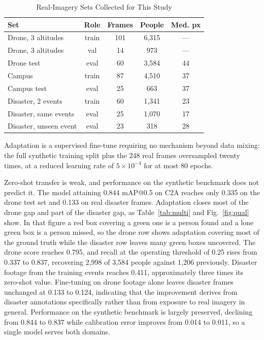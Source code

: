 \documentclass[conference,a4paper]{IEEEtran}
\begin{document}
\begin{table}[t]
\caption{Real-Imagery Sets Collected for This Study}
\label{tab:real}
\begin{center}
\small
\setlength{\tabcolsep}{4pt}
\begin{tabular}{|l|c|c|c|c|}
\hline
\textbf{Set} & \textbf{Role} & \textbf{Frames} & \textbf{People} & \textbf{Med. px} \\
\hline
Drone, 3 altitudes & train & 101 & 6{,}315 & --- \\
\hline
Drone, 3 altitudes & val & 14 & 973 & --- \\
\hline
Drone test & eval & 60 & 3{,}584 & 44 \\
\hline
Campus & train & 87 & 4{,}510 & 37 \\
\hline
Campus test & eval & 25 & 663 & 37 \\
\hline
Disaster, 2 events & train & 60 & 1{,}341 & 23 \\
\hline
Disaster, same events & eval & 25 & 1{,}070 & 17 \\
\hline
Disaster, unseen event & eval & 23 & 318 & 28 \\
\hline
\end{tabular}
\end{center}
\end{table}

Adaptation is a supervised fine-tune requiring no mechanism beyond data mixing:
the full synthetic training split plus the 248 real frames oversampled twenty
times, at a reduced learning rate of $5 \times 10^{-4}$ for at most 80 epochs.

Zero-shot transfer is weak, and performance on the synthetic benchmark does not
predict it. The model attaining 0.844 mAP@0.5 on C2A reaches only 0.335 on the
drone test set and 0.133 on real disaster frames. Adaptation closes most of the drone gap and part
of the disaster gap, as Table~\ref{tab:multi} and Fig.~\ref{fig:qual} show. In
that figure a red box covering a green one is a person found and a lone green
box is a person missed, so the drone row shows adaptation covering most of the
ground truth while the disaster row leaves many green boxes uncovered.
The drone score reaches 0.795, and recall at the operating threshold of 0.25
rises from 0.337 to 0.837, recovering 2{,}998 of 3{,}584 people against 1{,}206
previously. Disaster footage from the training events reaches 0.411,
approximately three times its zero-shot value. Fine-tuning on drone footage alone leaves disaster
frames unchanged at 0.133 to 0.124, indicating that the improvement derives from
disaster annotations specifically rather than from exposure to real imagery in
general. Performance on the synthetic benchmark is largely preserved, declining
from 0.844 to 0.837 while calibration error improves from 0.014 to 0.011, so a
single model serves both domains.
\end{document}
